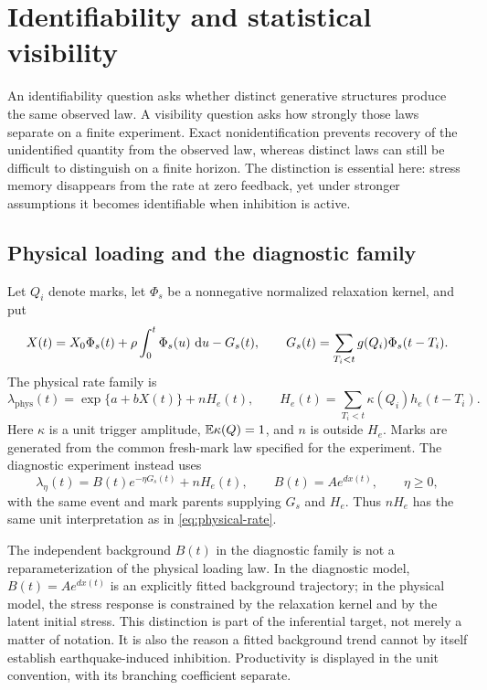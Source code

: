 \chapter{Identifiability and statistical visibility}\label{ch:identifiability}

An identifiability question asks whether distinct generative structures produce the same observed law. A visibility question asks how strongly those laws separate on a finite experiment. Exact nonidentification prevents recovery of the unidentified quantity from the observed law, whereas distinct laws can still be difficult to distinguish on a finite horizon. The distinction is essential here: stress memory disappears from the rate at zero feedback, yet under stronger assumptions it becomes identifiable when inhibition is active.

\section{Physical loading and the diagnostic family}

Let \(Q_i\) denote marks, let \(\Phi_s\) be a nonnegative normalized relaxation kernel, and put
\[
X(t)=X_0\Phi_s(t)+\rho\int_0^t\Phi_s(u)\,\mathop{}\!\mathrm{d} u-G_s(t),
\qquad
G_s(t)=\sum_{T_i<t}g(Q_i)\Phi_s(t-T_i).
\]
The physical rate family is
\begin{equation}
\lambda_{\mathrm{phys}}(t)
=\exp\{a+bX(t)\}+nH_e(t),
\qquad
H_e(t)=\sum_{T_i<t}\kappa(Q_i)h_e(t-T_i).
\label{eq:physical-rate}
\end{equation}
Here \(\kappa\) is a unit trigger amplitude, \(\mathbb{E} \kappa(Q)=1\), and \(n\) is outside \(H_e\). Marks are generated from the common fresh-mark law specified for the experiment. The diagnostic experiment instead uses
\begin{equation}
\lambda_\eta(t)=B(t)e^{-\eta G_s(t)}+nH_e(t),
\qquad
B(t)=A e^{d x(t)},\qquad \eta\ge0,
\label{eq:diagnostic-rate}
\end{equation}
with the same event and mark parents supplying \(G_s\) and \(H_e\). Thus \(nH_e\) has the same unit interpretation as in \eqref{eq:physical-rate}.

The independent background \(B(t)\) in the diagnostic family is not a reparameterization of the physical loading law. In the diagnostic model, \(B(t)=A e^{d x(t)}\) is an explicitly fitted background trajectory; in the physical model, the stress response is constrained by the relaxation kernel and by the latent initial stress. This distinction is part of the inferential target, not merely a matter of notation. It is also the reason a fitted background trend cannot by itself establish earthquake-induced inhibition. Productivity is displayed in the unit convention, with its branching coefficient separate.

